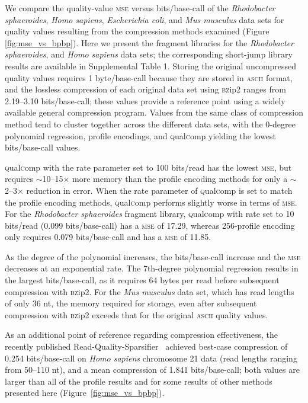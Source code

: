 \documentclass{bioinfo}
\begin{document}
We compare the quality-value \textsc{mse} versus bits/base-call of the
\textit{Rhodobacter sphaeroides}, \textit{Homo sapiens},
\textit{Escherichia coli}, and \textit{Mus musculus} data sets for
quality values resulting from the compression methods examined (Figure
\ref{fig:mse_vs_bpbp}). Here we present the fragment libraries for the
\textit{Rhodobacter sphaeroides}, and \textit{Homo sapiens} data sets;
the corresponding short-jump library results are available in
Supplemental Table 1. Storing the original uncompressed quality values
requires 1 byte/base-call because they are stored in \textsc{ascii}
format, and the lossless compression of each original data set using
\textsc{bz}ip2 ranges from 2.19--3.10 bits/base-call; these values
provide a reference point using a widely available general compression
program. Values from the same class of compression method tend to
cluster together across the different data sets, with the 0-degree
polynomial regression, profile encodings, and
\textsc{q}ual\textsc{c}omp yielding the lowest bits/base-call values.

\textsc{q}ual\textsc{c}omp with the rate parameter set to 100
bits/read has the lowest \textsc{mse}, but requires
$\sim$10--15$\times$ more memory than the profile encoding methods for
only a $\sim$2--3$\times$ reduction in error. When the rate parameter
of \textsc{q}ual\textsc{c}omp is set to match the profile encoding
methods, \textsc{q}ual\textsc{c}omp performs slightly worse in terms
of \textsc{mse}. For the \textit{Rhodobacter sphaeroides} fragment
library, \textsc{q}ual\textsc{c}omp with rate set to 10 bits/read
(0.099 bits/base-call) has a \textsc{mse} of 17.29, whereas
256-profile encoding only requires 0.079 bits/base-call and has a
\textsc{mse} of 11.85.

As the degree of the polynomial increases, the bits/base-call increase
and the \textsc{mse} decreases at an exponential rate. The 7th-degree
polynomial regression results in the largest bits/base-call, as it
requires 64 bytes per read before subsequent compression with
\textsc{bz}ip2. For the \textit{Mus musculus} data set, which has read
lengths of only 36 nt, the memory required for storage, even after
subsequent compression with \textsc{bz}ip2 exceeds that for the
original \textsc{ascii} quality values.

As an additional point of reference regarding compression
effectiveness, the recently published
Read-Quality-Sparsifier~\citep{DBLP:conf/recomb/YuYB14} achieved
best-case compression of 0.254 bits/base-call on \textit{Homo sapiens}
chromosome 21 data (read lengths ranging from 50--110 nt), and a mean
compression of 1.841 bits/base-call; both values are larger than all
of the profile results and for some results of other methods presented
here (Figure~\ref{fig:mse_vs_bpbp}).
\end{document}
